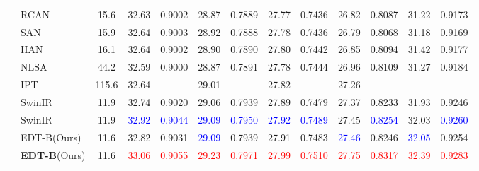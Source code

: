 \documentclass[runningheads]{llncs}
\begin{document}
\begin{table}[t]
\begin{center}
{\begin{tabular}{| c | l | c | c | c | c | c | c | c | c | c | c | c |}
					\multirow{9}{*}{} & RCAN~\cite{zhang2018image} & 15.6 & 32.63 & 0.9002 & 28.87 & 0.7889 & 27.77 & 0.7436 & 26.82 & 0.8087 & 31.22 & 0.9173 \\
					~ & SAN~\cite{dai2019second} & 15.9 & 32.64 & 0.9003 & 28.92 & 0.7888 & 27.78 & 0.7436 & 26.79 & 0.8068 & 31.18 & 0.9169 \\
~ & HAN~\cite{niu2020single} & 16.1 & 32.64 & 0.9002 & 28.90 & 0.7890 & 27.80 & 0.7442 & 26.85 & 0.8094 & 31.42 & 0.9177 \\
					~ & NLSA~\cite{mei2021image} & 44.2 & 32.59 & 0.9000 & 28.87 & 0.7891 & 27.78 & 0.7444 & 26.96 & 0.8109 & 31.27 & 0.9184 \\
~ & IPT~\cite{chen2021pre} & 115.6 & 32.64 & - & 29.01 & - & 27.82 & - & 27.26 & - & - & - \\
					~ & SwinIR~\cite{liang2021swinir} & 11.9 & 32.74 & 0.9020 & 29.06 & 0.7939 & 27.89 & 0.7479 & 27.37 & 0.8233 & 31.93 & 0.9246 \\
					~ & SwinIR{}~\cite{liang2021swinir} & 11.9 & \textcolor{blue}{32.92} & \textcolor{blue}{0.9044} & \textcolor{blue}{29.09} & \textcolor{blue}{0.7950} & \textcolor{blue}{27.92} & \textcolor{blue}{0.7489} & 27.45 & \textcolor{blue}{0.8254} & 32.03 & \textcolor{blue}{0.9260} \\
					~ & EDT-B(Ours) & 11.6 & 32.82 & 0.9031 & \textcolor{blue}{29.09} & 0.7939 & 27.91 & 0.7483 & \textcolor{blue}{27.46} & 0.8246 & \textcolor{blue}{32.05} & 0.9254 \\
					~ & \textbf{EDT-B}(Ours) & 11.6 & \textcolor{red}{33.06} & \textcolor{red}{0.9055} & \textcolor{red}{29.23} & \textcolor{red}{0.7971} & \textcolor{red}{27.99} & \textcolor{red}{0.7510} & \textcolor{red}{27.75} & \textcolor{red}{0.8317} & \textcolor{red}{32.39} & \textcolor{red}{0.9283} \\
					\hline
				\end{tabular}
			}
		\end{center}
		\vspace{-0.2in}
		\label{tab:classical_sr}
	\end{table}
	
\end{document}
